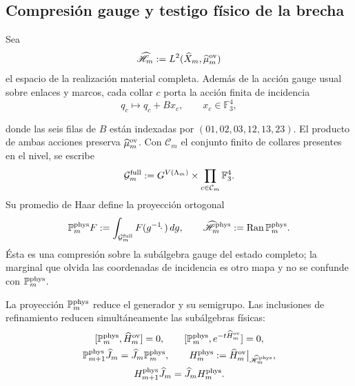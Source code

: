 \subsection*{Compresión gauge y testigo físico de la brecha}

Sea
\[
 \widehat{\mathscr H}_m
 :=L^2(\widehat X_m,\widehat\mu_m^{\rm ov})
\]
el espacio de la realización material completa. Además de la acción gauge
usual sobre enlaces y marcos, cada collar \(c\) porta la acción finita de
incidencia
\begin{equation}\label{eq:amp-ym-accion-gauge-incidencia}
 q_c\longmapsto q_c+Bx_c,
 \qquad x_c\in\mathbb F_3^4,
\end{equation}

donde las seis filas de \(B\) están indexadas por
\((01,02,03,12,13,23)\). El producto de ambas acciones preserva
\(\widehat\mu_m^{\rm ov}\). Con \(\mathcal C_m\) el conjunto finito de
collares presentes en el nivel, se escribe
\[
 \mathcal G_m^{\rm full}
 :=G^{V(\Lambda_m)}
   \times\prod_{c\in\mathcal C_m}\mathbb F_3^4.
\]
Su promedio de Haar define la proyección
ortogonal
\begin{equation}\label{eq:amp-ym-proyeccion-fisica-haar}
 \mathbb P_m^{\rm phys}F
 :=\int_{\mathcal G_m^{\rm full}}F(g^{-1}\!\cdot\,)\,dg,
 \qquad
 \widehat{\mathscr H}_m^{\rm phys}
 :=\operatorname{Ran}\mathbb P_m^{\rm phys}.
\end{equation}
Ésta es una compresión sobre la subálgebra gauge del estado completo; la
marginal que olvida las coordenadas de incidencia es otro mapa y no se
confunde con \(\mathbb P_m^{\rm phys}\).

\begin{lemma}
\label{lem:amp-ym-compresion-fisica}
La proyección \(\mathbb P_m^{\rm phys}\) reduce el generador y su
semigrupo. Las inclusiones de refinamiento reducen simultáneamente las
subálgebras físicas:
\begin{equation}\label{eq:amp-ym-compresion-entrelazada}
 \begin{gathered}
 \relax
 [\mathbb P_m^{\rm phys},\widehat H_m^{\rm ov}]=0,
 \qquad
 [\mathbb P_m^{\rm phys},e^{-t\widehat H_m^{\rm ov}}]=0,\\
 \mathbb P_{m+1}^{\rm phys}\widehat J_m
 =\widehat J_m\mathbb P_m^{\rm phys},\qquad
 H_m^{\rm phys}
 :=\widehat H_m^{\rm ov}\big|_{\widehat{\mathscr H}_m^{\rm phys}},\\
 H_{m+1}^{\rm phys}\widehat J_m
 =\widehat J_mH_m^{\rm phys}.
 \end{gathered}
\end{equation}
\end{lemma}

